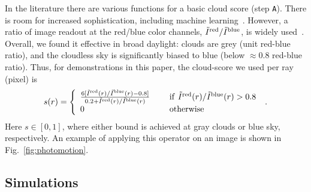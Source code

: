 \documentclass[runningheads]{llncs}
\begin{document}
In the literature there are various functions for a basic cloud score (step {\tt A}). There is room for increased sophistication, including machine learning~\cite{Peng2014}. However, a ratio of image readout at the red/blue color channels, $\tilde I^{\rm red}/\tilde I^{\rm blue}$, is widely used~\cite{Seiz2002,Yamashita2004}. Overall, we found it effective in broad daylight: clouds are grey (unit red-blue ratio), and the cloudless sky is significantly biased to blue
(below $\approx 0.8$ red-blue ratio). Thus, for demonstrations in this paper,
the cloud-score we used per ray (pixel) is
\begin{equation}
 s(r)=\left\{
      \begin{array}{ll}
      \frac{6 [\tilde I^{\rm red}(r)/\tilde I^{\rm blue}(r)-0.8]}
           {0.2+\tilde I^{\rm red}(r)/\tilde I^{\rm blue}(r)}
      & ~~~~{\rm if}~ \tilde I^{\rm red}(r)/\tilde I^{\rm blue}(r)>0.8 \\
      0
      & ~~~~{\rm otherwise}
      \end{array}
      \right.
  \;.
 \label{eq:sr}
\end{equation}
Here $s\in[0,1]$, where either bound is achieved at gray clouds or blue sky, respectively. An example of applying this operator on an image is shown in Fig.~\ref{fig:photomotion}.



\subsection*{Simulations}
\label{sec:simulation}
\end{document}
